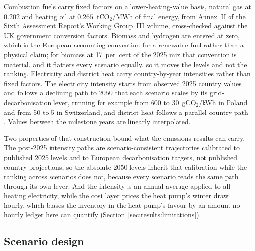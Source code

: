 Combustion fuels carry fixed factors on a lower-heating-value basis, natural gas at
$0.202$ and heating oil at $0.265$~tCO$_2$/MWh of final energy, from Annex~II of the Sixth Assessment Report's Working Group~III volume, cross-checked against the UK government conversion factors. Biomass and hydrogen are entered
at zero, which is the European accounting convention for a renewable fuel rather than a
physical claim; for biomass at 17~per~cent of the 2025 mix that convention is material,
and it flatters every scenario equally, so it moves the levels and not the ranking.
Electricity and district heat carry country-by-year intensities rather than fixed
factors. The electricity intensity starts from observed 2025 country values
\citep{EMBER2024electricity} and follows a declining path to 2050 that each scenario
scales by its grid-decarbonisation lever, running for example from 600 to
30~gCO$_2$/kWh in Poland and from 50 to 5 in Switzerland, and district heat follows a
parallel country path \citep{EEA2024gridintensity}. Values between the milestone years
are linearly interpolated.

Two properties of that construction bound what the emissions results can carry. The
post-2025 intensity paths are scenario-consistent trajectories calibrated to published
2025 levels and to European decarbonisation targets, not published country projections,
so the absolute 2050 levels inherit that calibration while the ranking across scenarios
does not, because every scenario reads the same path through its own lever. And the
intensity is an annual average applied to all heating electricity, while the cost layer
prices the heat pump's winter draw hourly, which biases the inventory in the heat pump's
favour by an amount no hourly ledger here can quantify
(Section~\ref{sec:results:limitations}).

\subsection{Scenario design}
\label{sec:method:scenarios}


